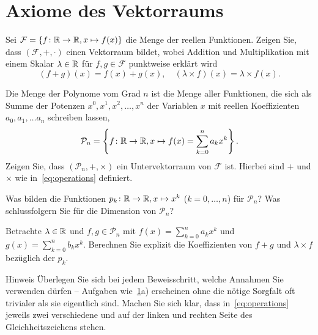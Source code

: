 \documentclass{scrartcl}
\newcommand{\FF}{\mathcal{F}}
\newcommand{\PP}{\mathcal{P}}
\begin{document}
\maketitle

\section{Axiome des Vektorraums}
\label{ex:functionspace}
\begin{subex}
  \item Sei $\FF = \{ f\colon \RR\to\RR, x \mapsto f(x) \}$ die Menge der reellen Funktionen.
  Zeigen Sie, dass $(\FF,+,\cdot)$ einen Vektorraum bildet, wobei Addition und Multiplikation mit einem Skalar $\lambda \in \mathbb{R}$ für $f, g \in \FF$ punktweise erklärt wird
  \[
    \label{eq:operations}\tag{*}
    (f + g)(x) = f(x) + g(x), \quad (\lambda \times f)(x) = \lambda \times f(x).
  \]

  \item Die Menge der Polynome vom Grad $n$ ist die Menge aller Funktionen, die sich als Summe der Potenzen $x^0,x^1,x^2,\dots, x^n$ der Variablen $x$ mit reellen Koeffizienten $a_0, a_1, \dots a_n$ schreiben lassen,
  \[
    \PP_n  = \left\{ f\colon \RR \to \RR, x \mapsto f(x) = \sum_{k=0}^n a_k x^k \right\}.
  \]
  Zeigen Sie, dass $(\PP_n,+,\times)$ ein Untervektorraum von $\FF$ ist.
  Hierbei sind $+$ und $\times$ wie in~\eqref{eq:operations} definiert.

  \item Was bilden die Funktionen $p_k\colon \mathbb{R} \to \mathbb{R}, x \mapsto x^k$ ($k=0,\ldots,n$) für $\PP_n$?
  Was schlussfolgern Sie für die Dimension von $\PP_n$?

  \item Betrachte $\lambda \in \mathbb{R}$ und $f,g \in \PP_n$ mit $f(x) = \sum_{k=0}^n a_k x^k$ und $g(x) = \sum_{k=0}^n b_k x^k$.
  Berechnen Sie explizit die Koeffizienten von $f + g$ und $\lambda \times f$ bezüglich der $p_k$.
\end{subex}

\begin{remark}{Hinweis}
  Überlegen Sie sich bei jedem Beweisschritt, welche Annahmen Sie verwenden dürfen -- Aufgaben wie~\ref{ex:functionspace}a) erscheinen ohne die nötige Sorgfalt oft trivialer als sie eigentlich sind.
  Machen Sie sich klar, dass in~\eqref{eq:operations} jeweils zwei verschiedene \quotes{$+$} und \quotes{$\times$} auf der linken und rechten Seite des Gleichheitszeichens stehen.
\end{remark}
\end{document}
